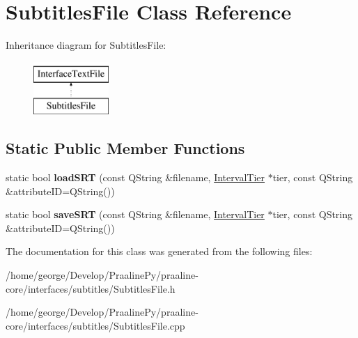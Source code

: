 \hypertarget{class_subtitles_file}{}\section{Subtitles\+File Class Reference}
\label{class_subtitles_file}
Inheritance diagram for Subtitles\+File\+:\begin{figure}[H]
\begin{center}
\leavevmode
\includegraphics[height=2.000000cm]{class_subtitles_file}
\end{center}
\end{figure}
\subsection*{Static Public Member Functions}
\begin{DoxyCompactItemize}
\item 
\mbox{\label{class_subtitles_file_ad989aa2068057c91c06581f3b477ed95}} 
static bool {\bfseries load\+S\+RT} (const Q\+String \&filename, \hyperlink{class_interval_tier}{Interval\+Tier} $\ast$tier, const Q\+String \&attribute\+ID=Q\+String())
\item 
\mbox{\label{class_subtitles_file_aa8a907182e16c9c6908063f79b826c29}} 
static bool {\bfseries save\+S\+RT} (const Q\+String \&filename, \hyperlink{class_interval_tier}{Interval\+Tier} $\ast$tier, const Q\+String \&attribute\+ID=Q\+String())
\end{DoxyCompactItemize}


The documentation for this class was generated from the following files\+:\begin{DoxyCompactItemize}
\item 
/home/george/\+Develop/\+Praaline\+Py/praaline-\/core/interfaces/subtitles/Subtitles\+File.\+h\item 
/home/george/\+Develop/\+Praaline\+Py/praaline-\/core/interfaces/subtitles/Subtitles\+File.\+cpp\end{DoxyCompactItemize}
